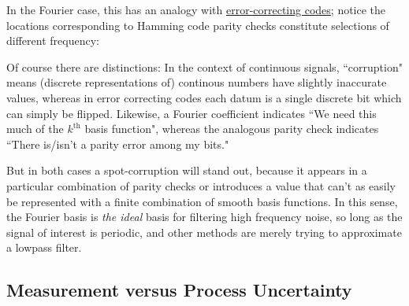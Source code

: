 \documentclass[10pt]{article}
\begin{document}
In the Fourier case, this has an analogy with \href{https://www.youtube.com/watch?v=X8jsijhllIA}{error-correcting codes}\cite{sanderson, hamming}; notice the locations corresponding to Hamming code parity checks constitute selections of different frequency:

\begin{center}
\vspace{-2mm}
\end{center}

Of course there are distinctions: In the context of continuous signals, ``corruption" means (discrete representations of) continous numbers have slightly inaccurate values, whereas in error correcting codes each datum is a single discrete bit which can simply be flipped. Likewise, a Fourier coefficient indicates ``We need this much of the $k^\text{th}$ basis function", whereas the analogous parity check indicates ``There is/isn't a parity error among my bits."

But in both cases a spot-corruption will stand out, because it appears in a particular combination of parity checks or introduces a value that can't as easily be represented with a finite combination of smooth basis functions. In this sense, the Fourier basis is \textit{the ideal} basis for filtering high frequency noise, so long as the signal of interest is periodic, and other methods are merely trying to approximate a lowpass filter.

\subsection{Measurement versus Process Uncertainty}
\end{document}
